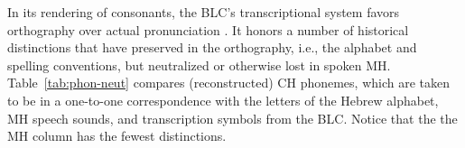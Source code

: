 In its rendering of consonants, the \ac{BLC}'s transcriptional system 
favors orthography over actual pronunciation \citep{albert-et-al:2013}.
It honors a number of historical distinctions that have preserved in the orthography, 
i.e., the alphabet and 
spelling conventions, but neutralized or otherwise lost in spoken \ac{MH}. 
Table~\ref{tab:phon-neut} compares 
(reconstructed) \ac{CH} phonemes, which are taken to be in a one-to-one 
correspondence with the letters of 
the Hebrew alphabet, \ac{MH} speech sounds, and transcription symbols 
from the \ac{BLC}. Notice that the
the \ac{MH} column has the fewest distinctions.




